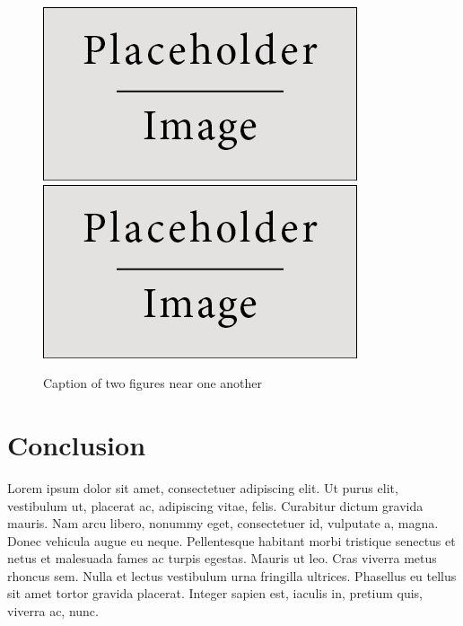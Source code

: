\documentclass[a4paper]{article}
\theoremstyle{plain}
\begin{document}
\begin{figure}[H]
\centering
\includegraphics[scale=0.4]{test_image.jpg}
\includegraphics[scale=0.4]{test_image.jpg}
\caption{Caption of two figures near one another}
\end{figure}

\section*{Conclusion}

Lorem ipsum dolor sit amet, consectetuer adipiscing elit. Ut purus elit, vestibulum ut, placerat ac, adipiscing vitae, felis. Curabitur dictum gravida mauris. Nam arcu libero, nonummy eget, consectetuer id, vulputate a, magna. Donec vehicula augue eu neque. Pellentesque habitant morbi tristique senectus et netus et malesuada fames ac turpis egestas. Mauris ut leo. Cras viverra metus rhoncus sem. Nulla et lectus vestibulum urna fringilla ultrices. Phasellus eu tellus sit amet tortor gravida placerat. Integer sapien est, iaculis in, pretium quis, viverra ac, nunc.

\nocite{*}


\end{document}
